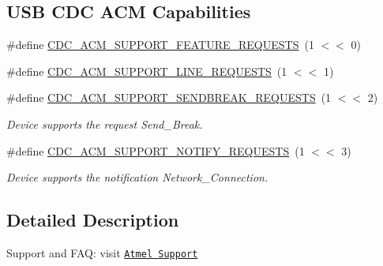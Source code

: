 \subsection*{U\-S\-B C\-D\-C A\-C\-M Capabilities}
\begin{DoxyCompactItemize}
\item 
\#define \hyperlink{group__cdc__protocol__group_gab1dab8b998f3a80f796edaf74567d4a7}{C\-D\-C\-\_\-\-A\-C\-M\-\_\-\-S\-U\-P\-P\-O\-R\-T\-\_\-\-F\-E\-A\-T\-U\-R\-E\-\_\-\-R\-E\-Q\-U\-E\-S\-T\-S}~(1 $<$$<$ 0)
\item 
\#define \hyperlink{group__cdc__protocol__group_gacba280f60d9dacf049a41a6711b1e9b2}{C\-D\-C\-\_\-\-A\-C\-M\-\_\-\-S\-U\-P\-P\-O\-R\-T\-\_\-\-L\-I\-N\-E\-\_\-\-R\-E\-Q\-U\-E\-S\-T\-S}~(1 $<$$<$ 1)
\item 
\hypertarget{group__cdc__protocol__group_ga5e20369c655ed417fb699944b064ebdc}{\#define \hyperlink{group__cdc__protocol__group_ga5e20369c655ed417fb699944b064ebdc}{C\-D\-C\-\_\-\-A\-C\-M\-\_\-\-S\-U\-P\-P\-O\-R\-T\-\_\-\-S\-E\-N\-D\-B\-R\-E\-A\-K\-\_\-\-R\-E\-Q\-U\-E\-S\-T\-S}~(1 $<$$<$ 2)}\label{group__cdc__protocol__group_ga5e20369c655ed417fb699944b064ebdc}

\begin{DoxyCompactList}\small\item\em Device supports the request Send\-\_\-\-Break. \end{DoxyCompactList}\item 
\hypertarget{group__cdc__protocol__group_gac7cc3782b884395213a99ffae74b159f}{\#define \hyperlink{group__cdc__protocol__group_gac7cc3782b884395213a99ffae74b159f}{C\-D\-C\-\_\-\-A\-C\-M\-\_\-\-S\-U\-P\-P\-O\-R\-T\-\_\-\-N\-O\-T\-I\-F\-Y\-\_\-\-R\-E\-Q\-U\-E\-S\-T\-S}~(1 $<$$<$ 3)}\label{group__cdc__protocol__group_gac7cc3782b884395213a99ffae74b159f}

\begin{DoxyCompactList}\small\item\em Device supports the notification Network\-\_\-\-Connection. \end{DoxyCompactList}\end{DoxyCompactItemize}


\subsection{Detailed Description}
Support and F\-A\-Q\-: visit \href{http://www.atmel.com/design-support/}{\tt Atmel Support} 

